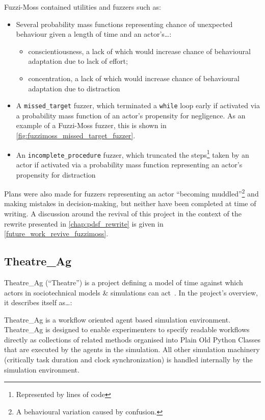 Fuzzi-Moss contained utilities and fuzzers such as:

\begin{itemize}
    \item Several probability mass functions representing chance of
    unexpected behaviour given a length of time and an actor's\ldots{}:
    \begin{itemize}
        \item conscientiousness, a lack of which would increase chance of behavioural adaptation due to lack
    of effort;
        \item concentration, a lack of which would increase chance of behavioural
    adaptation due to distraction
    \end{itemize}
    \item A \lstinline{missed_target} fuzzer, which terminated a
    \lstinline{while} loop early if activated via a probability mass function of
    an actor's propensity for negligence. As an example of a Fuzzi-Moss fuzzer,
    this is shown in \cref{fig:fuzzimoss_missed_target_fuzzer}.
    \item An \lstinline{incomplete_procedure} fuzzer, which truncated the
    steps\footnote{Represented by lines of code} taken by an actor if activated
    via a probability mass function representing an actor's propensity for
    distraction
\end{itemize}

Plans were also made for fuzzers representing an actor ``becoming
muddled''\footnote{A behavioural variation caused by confusion.} and making
mistakes in decision-making, but neither have been completed at time of writing.
A discussion around the revival of this project in the context of the \pdsf
rewrite presented in \cref{chap:pdsf_rewrite} is given in
\cref{future_work_revive_fuzzimoss}. 


\subsection{Theatre\_Ag}\label{subsec:prior_work_theatre}

Theatre\_Ag (``Theatre'') is a project defining a model of time against which actors in
sociotechnical models \& simulations can act~\cite{theatre_ag_repo}. In the
project's overview, it describes itself as\ldots{}:

\begin{blockquote}
Theatre\_Ag is a workflow oriented agent based simulation environment.
Theatre\_Ag is designed to enable experimenters to specify readable workflows
directly as collections of related methods organised into Plain Old Python
Classes that are executed by the agents in the simulation. All other simulation
machinery (critically task duration and clock synchronization) is handled
internally by the simulation environment.
\end{blockquote}

